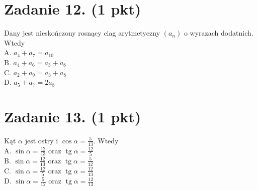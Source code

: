 \documentclass[10pt]{article}
\begin{document}
\section*{Zadanie 12. (1 pkt)}
Dany jest nieskończony rosnący ciag arytmetyczny \(\left(a_{n}\right)\) o wyrazach dodatnich. Wtedy\\
A. \(a_{4}+a_{7}=a_{10}\)\\
B. \(a_{4}+a_{6}=a_{3}+a_{8}\)\\
C. \(a_{2}+a_{9}=a_{3}+a_{8}\)\\
D. \(a_{5}+a_{7}=2 a_{8}\)

\section*{Zadanie 13. (1 pkt)}
Kąt \(\alpha\) jest ostry i \(\cos \alpha=\frac{5}{13}\). Wtedy\\
A. \(\sin \alpha=\frac{12}{13}\) oraz \(\operatorname{tg} \alpha=\frac{12}{5}\)\\
B. \(\sin \alpha=\frac{12}{13}\) oraz \(\operatorname{tg} \alpha=\frac{5}{12}\)\\
C. \(\sin \alpha=\frac{12}{5}\) oraz \(\operatorname{tg} \alpha=\frac{12}{13}\)\\
D. \(\sin \alpha=\frac{5}{12}\) oraz \(\operatorname{tg} \alpha=\frac{12}{13}\)
\end{document}
